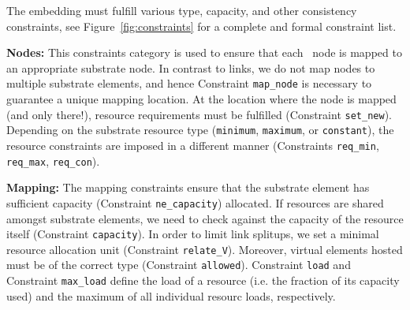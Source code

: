 \documentclass[conference,10pt]{IEEEtran}
\newcommand{\CloudNet}{\text{CloudNet}}
\begin{document}
The embedding must fulfill various type, capacity, and other
consistency constraints, see Figure~\ref{fig:constraints} for a
complete and formal constraint list.

\begin{description*}
\item \textbf{Nodes:} This constraints category is used to ensure that each \CloudNet\
  node is mapped to an appropriate substrate node. In contrast to
  links, we do not map nodes to multiple substrate elements, and hence
  Constraint \texttt{map\_node} is necessary to guarantee a unique mapping
  location. At the location where the node is mapped (and only there!),
  resource requirements must be fulfilled (Constraint
  \texttt{set\_new}). Depending on the substrate resource type
  (\texttt{minimum}, \texttt{maximum}, or \texttt{constant}), the resource
  constraints are imposed in a different manner (Constraints
  \texttt{req\_min}, \texttt{req\_max}, \texttt{req\_con}).

\item \textbf{Mapping:} The mapping constraints ensure that the substrate element has
  sufficient capacity (Constraint \texttt{ne\_capacity}) allocated.
  If resources are shared amongst substrate elements, we need to check against the capacity of the resource itself (Constraint \texttt{capacity}).
  In order to limit link splitups, we set a minimal resource allocation unit (Constraint \texttt{relate\_V}).
  Moreover, virtual elements hosted must be of the correct type
  (Constraint \texttt{allowed}).
Constraint \texttt{load} and Constraint
  \texttt{max\_load} define the load of a resource (i.e. the fraction of its capacity used)
and the maximum of all individual resourc
  loads, respectively.


\end{description*}
\end{document}
